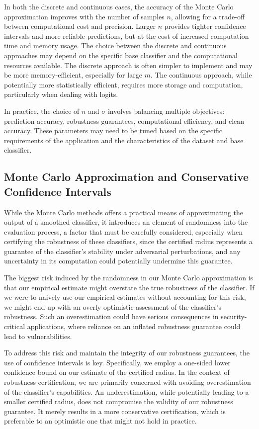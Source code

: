 In both the discrete and continuous cases, the accuracy of the Monte Carlo approximation improves with the number of samples $n$, allowing for a trade-off between computational cost and precision.
Larger $n$ provides tighter confidence intervals and more reliable predictions, but at the cost of increased computation time and memory usage.
The choice between the discrete and continuous approaches may depend on the specific base classifier and the computational resources available.
The discrete approach is often simpler to implement and may be more memory-efficient, especially for large $m$.
The continuous approach, while potentially more statistically efficient, requires more storage and computation, particularly when dealing with logits.

In practice, the choice of $n$ and $\sigma$ involves balancing multiple objectives: prediction accuracy, robustness guarantees, computational efficiency, and clean accuracy.
These parameters may need to be tuned based on the specific requirements of the application and the characteristics of the dataset and base classifier.

\subsection{Monte Carlo Approximation and Conservative Confidence Intervals}\label{subsec:monte-carlo-approximation-and-conservative-confidence-intervals}

While the Monte Carlo methods offers a practical means of approximating the output of a smoothed classifier, it introduces an element of randomness into the evaluation process, a factor that must be carefully considered, especially when certifying the robustness of these classifiers, since the certified radius represents a guarantee of the classifier's stability under adversarial perturbations, and any uncertainty in its computation could potentially undermine this guarantee.

The biggest risk induced by the randomness in our Monte Carlo approximation is that our empirical estimate might overstate the true robustness of the classifier.
If we were to naively use our empirical estimates without accounting for this risk, we might end up with an overly optimistic assessment of the classifier's robustness.
Such an overestimation could have serious consequences in security-critical applications, where reliance on an inflated robustness guarantee could lead to vulnerabilities.

To address this risk and maintain the integrity of our robustness guarantees, the use of confidence intervals is key.
Specifically, we employ a one-sided lower confidence bound on our estimate of the certified radius.
In the context of robustness certification, we are primarily concerned with avoiding overestimation of the classifier's capabilities.
An underestimation, while potentially leading to a smaller certified radius, does not compromise the validity of our robustness guarantee.
It merely results in a more conservative certification, which is preferable to an optimistic one that might not hold in practice.

